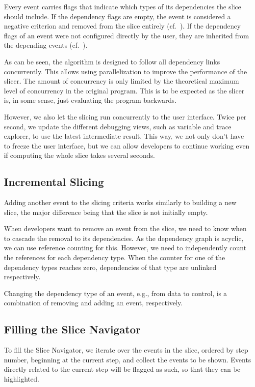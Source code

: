 \documentclass[
			english,
			review,
			]{elsarticle}
\begin{document}
Every event carries flags that indicate which types of its dependencies the slice should include.
If the dependency flags are empty, the event is considered a negative criterion and removed from the slice entirely (cf.~).
If the dependency flags of an event were not configured directly by the user, they are inherited from the depending events (cf.~).

As can be seen, the algorithm is designed to follow all dependency links concurrently.
This allows using parallelization to improve the performance of the slicer.
The amount of concurrency is only limited by the theoretical maximum level of concurrency in the original program.
This is to be expected as the slicer is, in some sense, just evaluating the program backwards.

However, we also let the slicing run concurrently to the user interface.
Twice per second, we update the different debugging views, such as variable and trace explorer, to use the latest intermediate result.
This way, we not only don't have to freeze the user interface, but we can allow developers to continue working even if computing the whole slice takes several seconds.

\subsection{Incremental Slicing}

Adding another event to the slicing criteria works similarly to building a new slice, the major difference being that the slice is not initially empty.

When developers want to remove an event from the slice, we need to know when to cascade the removal to its dependencies.
As the dependency graph is acyclic, we can use reference counting for this.
However, we need to independently count the references for each dependency type.
When the counter for one of the dependency types reaches zero, dependencies of that type are unlinked respectively.

Changing the dependency type of an event, e.g., from data to control, is a combination of removing and adding an event, respectively.

\subsection{Filling the Slice Navigator}

To fill the Slice Navigator, we iterate over the events in the slice, ordered by step number, beginning at the current step, and collect the events to be shown.
Events directly related to the current step will be flagged as such, so that they can be highlighted.
\end{document}
